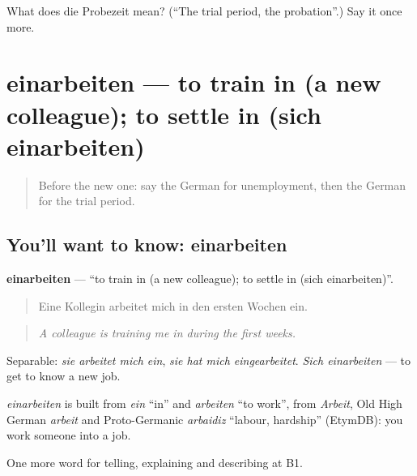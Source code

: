 \begin{tcolorbox}[breakable,colback=teal!4,colframe=teal!35!black,title={Before you move on}]
What does die Probezeit mean? (\textquotedblleft{}The trial period, the probation\textquotedblright{}.) Say it once more.
\end{tcolorbox}
\section[einarbeiten]{einarbeiten — to train in (a new colleague); to settle in (sich einarbeiten)}

\label{lesson:GE-C352-einarbeiten}



\begin{quote}
Before the new one: say the German for unemployment, then the German for the trial period.
\end{quote}

\subsection*{You'll want to know: einarbeiten}
\textbf{einarbeiten} — \textquotedblleft{}to train in (a new colleague); to settle in (sich einarbeiten)\textquotedblright{}.

\begin{quote}
Eine Kollegin arbeitet mich in den ersten Wochen ein.
\end{quote}

\begin{quote}
\emph{A colleague is training me in during the first weeks.}
\end{quote}

Separable: \emph{sie arbeitet mich ein}, \emph{sie hat mich eingearbeitet}. \emph{Sich einarbeiten} — to get to know a new job.

\begin{cousinweb}
\emph{einarbeiten} is built from \emph{ein} \textquotedblleft{}in\textquotedblright{} and \emph{arbeiten} \textquotedblleft{}to work\textquotedblright{}, from \emph{Arbeit}, Old High German \emph{arbeit} and Proto-Germanic \emph{arbaidiz} \textquotedblleft{}labour, hardship\textquotedblright{} (EtymDB): you work someone into a job.
\end{cousinweb}

\begin{grammarlens}[title={What you've built}]
One more word for telling, explaining and describing at B1.
\end{grammarlens}


